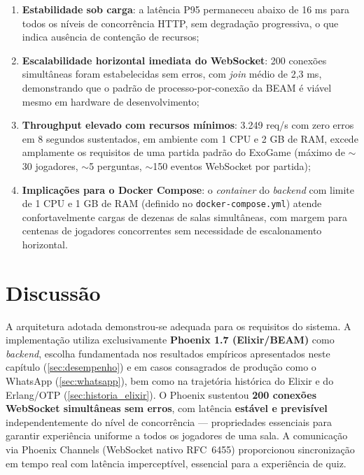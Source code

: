 \documentclass[
	12pt,
	openany,
	oneside,
	a4paper,
	english,
	brazil
]{abntex2}
\begin{document}
\begin{enumerate}
  \item \textbf{Estabilidade sob carga}: a latência P95 permaneceu abaixo de 16 ms para todos os níveis de concorrência HTTP, sem degradação progressiva, o que indica ausência de contenção de recursos;
  
  \item \textbf{Escalabilidade horizontal imediata do WebSocket}: 200 conexões simultâneas foram estabelecidas sem erros, com \textit{join} médio de 2,3 ms, demonstrando que o padrão de processo-por-conexão da BEAM é viável mesmo em hardware de desenvolvimento;
  
  \item \textbf{Throughput elevado com recursos mínimos}: 3.249 req/s com zero erros em 8 segundos sustentados, em ambiente com 1 CPU e 2 GB de RAM, excede amplamente os requisitos de uma partida padrão do ExoGame (máximo de $\sim$30 jogadores, $\sim$5 perguntas, $\sim$150 eventos WebSocket por partida);
  
  \item \textbf{Implicações para o Docker Compose}: o \textit{container} do \textit{backend} com limite de 1 CPU e 1 GB de RAM (definido no \texttt{docker-compose.yml}) atende confortavelmente cargas de dezenas de salas simultâneas, com margem para centenas de jogadores concorrentes sem necessidade de escalonamento horizontal.
\end{enumerate}

\section{Discussão}

A arquitetura adotada demonstrou-se adequada para os requisitos do sistema. A implementação utiliza exclusivamente \textbf{Phoenix 1.7 (Elixir/BEAM)} como \textit{backend}, escolha fundamentada nos resultados empíricos apresentados neste capítulo (\autoref{sec:desempenho}) e em casos consagrados de produção como o WhatsApp (\autoref{sec:whatsapp}), bem como na trajetória histórica do Elixir e do Erlang/OTP (\autoref{sec:historia_elixir}). O Phoenix sustentou \textbf{200 conexões WebSocket simultâneas sem erros}, com latência \textbf{estável e previsível} independentemente do nível de concorrência --- propriedades essenciais para garantir experiência uniforme a todos os jogadores de uma sala. A comunicação via Phoenix Channels (WebSocket nativo RFC~6455) proporcionou sincronização em tempo real com latência imperceptível, essencial para a experiência de quiz.
\end{document}
